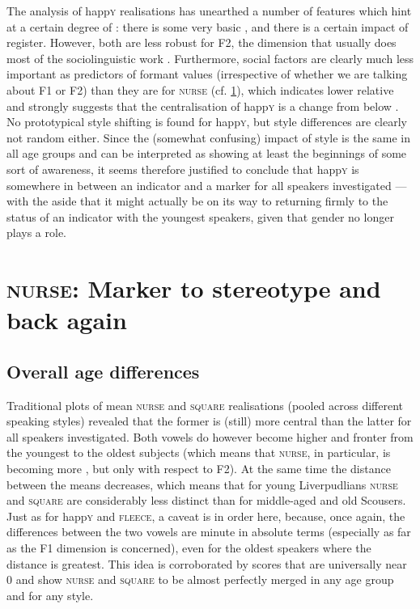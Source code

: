 The analysis of happ\textsc{y} realisations has unearthed a number of features which hint at a certain degree of : there is some very basic , and there is a certain impact of register.
However, both are less robust for F2, the  dimension that usually does most of the sociolinguistic work \parencite[cf.][502]{labov2006a}.
Furthermore, social factors are clearly much less important as predictors of formant values (irrespective of whether we are talking about F1 or F2) than they are for \textsc{nurse} (cf. \ref{prod.disc.nurse}), which indicates lower relative  and strongly suggests that the centralisation of happ\textsc{y} is a change from below \parencite[cf.][78]{labov1994}.
No prototypical style shifting is found for happ\textsc{y}, but style differences are clearly not random either.
Since the (somewhat confusing) impact of style is the same in all age groups and can be interpreted as showing at least the beginnings of some sort of awareness, it seems therefore justified to conclude that happ\textsc{y} is somewhere in between an indicator and a marker for all speakers investigated --- with the aside that it might actually be on its way to returning firmly to the status of an indicator with the youngest speakers, given that gender no longer plays a role.

\section{\textrm{\textsc{nurse}}: Marker to stereotype and back again}
\label{prod.disc.nurse}

\subsection{Overall age differences}
\label{prod.disc.nurse.age}

Traditional  plots of mean \textsc{nurse} and \textsc{square} realisations (pooled across different speaking styles) revealed that the former is (still) more central than the latter for all speakers investigated.
Both vowels do however become higher and fronter from the youngest to the oldest subjects (which means that \textsc{nurse}, in particular, is becoming more , but only with respect to F2).
At the same time the distance between the means decreases, which means that for young Liverpudlians \textsc{nurse} and \textsc{square} are considerably less distinct than for middle-aged and old Scousers.
Just as for happ\textsc{y} and \textsc{fleece}, a caveat is in order here, because, once again, the differences between the two vowels are minute in absolute terms (especially as far as the F1 dimension is concerned), even for the oldest speakers where the distance is greatest.
This idea is corroborated by  scores that are universally near 0 and show \textsc{nurse} and \textsc{square} to be almost perfectly merged in any age group and for any style.

